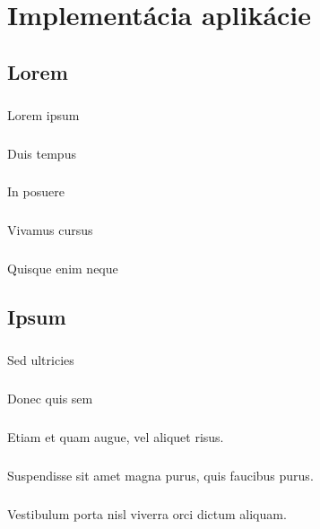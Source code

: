 \chapter{Implementácia aplikácie}
\section{Lorem}
\paragraph{}
Lorem ipsum 

\paragraph{}
Duis tempus 

\paragraph{}
In posuere 

\paragraph{}
Vivamus cursus 

\paragraph{}
Quisque enim neque

\section{Ipsum}
\paragraph{}
Sed ultricies 

\paragraph{}
Donec quis sem 

\paragraph{}
Etiam et quam augue, vel aliquet risus. 

\paragraph{}
Suspendisse sit amet magna purus, quis faucibus purus. 

\paragraph{}
Vestibulum porta nisl viverra orci dictum aliquam. 
